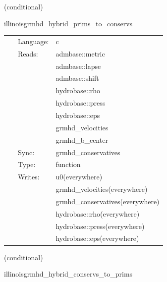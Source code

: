 \documentclass{article}
\begin{document}
\vspace{5mm}

   (conditional) 

\hspace{5mm} illinoisgrmhd\_hybrid\_prims\_to\_conservs 

\hspace{5mm}{\it hybrid version of illinoisgrmhd\_prims\_to\_conservs } 


\hspace{5mm}

 \begin{tabular*}{160mm}{cll} 
~ & Language:  & c \\ 
~ & Reads:  & admbase::metric \\ 
~& ~ &admbase::lapse\\ 
~& ~ &admbase::shift\\ 
~& ~ &hydrobase::rho\\ 
~& ~ &hydrobase::press\\ 
~& ~ &hydrobase::eps\\ 
~& ~ &grmhd\_velocities\\ 
~& ~ &grmhd\_b\_center\\ 
~ & Sync:  & grmhd\_conservatives \\ 
~ & Type:  & function \\ 
~ & Writes:  & u0(everywhere) \\ 
~& ~ &grmhd\_velocities(everywhere)\\ 
~& ~ &grmhd\_conservatives(everywhere)\\ 
~& ~ &hydrobase::rho(everywhere)\\ 
~& ~ &hydrobase::press(everywhere)\\ 
~& ~ &hydrobase::eps(everywhere)\\ 
\end{tabular*} 


\vspace{5mm}

   (conditional) 

\hspace{5mm} illinoisgrmhd\_hybrid\_conservs\_to\_prims 

\hspace{5mm}{\it hybrid version of illinoisgrmhd\_conservs\_to\_prims } 


\hspace{5mm}
\end{document}
